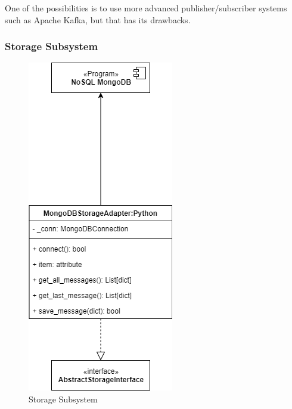 One of the possibilities is to use more advanced publisher/subscriber
systems such as Apache Kafka, but that has its drawbacks.

\subsubsection{Storage Subsystem}\label{storage-subsystem}

\begin{figure}[H]
	\centering
	\includegraphics[width=\linewidth,height=0.4\textheight,keepaspectratio]{schemes/classes/ClassDiagram-storage_subsystem.png}
\caption{Storage Subsystem}
\end{figure}

